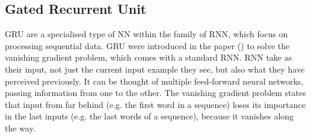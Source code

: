 \subsection{Gated Recurrent Unit}
\label{sub:Gated-Recurrent-Unit}

\gls{GRU} are a specialised type of \gls{NN} within the family of \gls{RNN}, which focus on processing sequential data. \gls{GRU} were introduced in the paper (\cite{cho_learning_2014}) to solve the vanishing gradient problem, which comes with a standard \gls{RNN}. \gls{RNN} take as their input, not just the current input example they see, but also what they have perceived previously. It can be thought of multiple feed-forward neural networks, passing information from one to the other. The vanishing gradient problem states that input from far behind (e.g. the first word in a sequence) loses its importance in the last inputs (e.g. the last words of a sequence), because it vanishes along the way.

